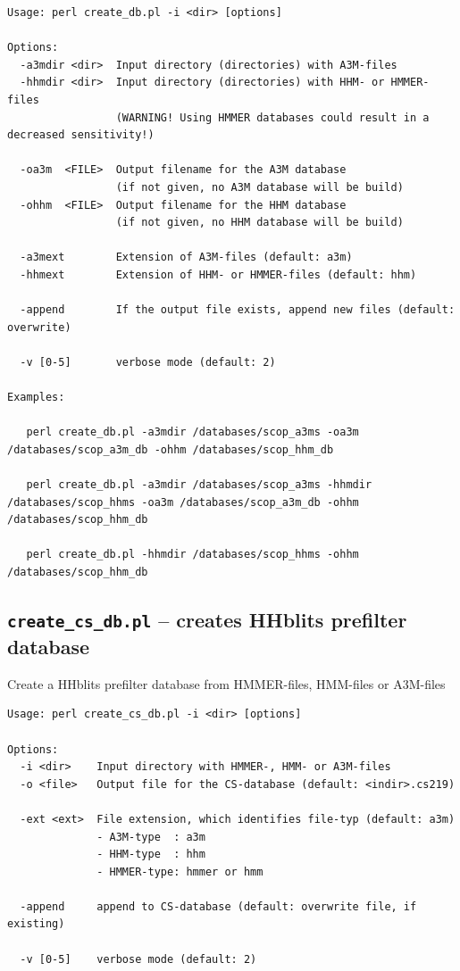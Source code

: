 \documentclass[11pt,a4paper]{article}
\begin{document}
\small \begin{verbatim}
Usage: perl create_db.pl -i <dir> [options]

Options:
  -a3mdir <dir>  Input directory (directories) with A3M-files
  -hhmdir <dir>  Input directory (directories) with HHM- or HMMER-files 
                 (WARNING! Using HMMER databases could result in a decreased sensitivity!)

  -oa3m  <FILE>  Output filename for the A3M database 
                 (if not given, no A3M database will be build)
  -ohhm  <FILE>  Output filename for the HHM database 
                 (if not given, no HHM database will be build)

  -a3mext        Extension of A3M-files (default: a3m)
  -hhmext        Extension of HHM- or HMMER-files (default: hhm)

  -append        If the output file exists, append new files (default: overwrite)

  -v [0-5]       verbose mode (default: 2)

Examples:

   perl create_db.pl -a3mdir /databases/scop_a3ms -oa3m /databases/scop_a3m_db -ohhm /databases/scop_hhm_db

   perl create_db.pl -a3mdir /databases/scop_a3ms -hhmdir /databases/scop_hhms -oa3m /databases/scop_a3m_db -ohhm /databases/scop_hhm_db

   perl create_db.pl -hhmdir /databases/scop_hhms -ohhm /databases/scop_hhm_db
\end{verbatim} \normalsize

\subsection{{\tt create\_cs\_db.pl} -- creates HHblits prefilter database}

Create a HHblits prefilter database from HMMER-files, HMM-files or A3M-files

\small \begin{verbatim}
Usage: perl create_cs_db.pl -i <dir> [options]

Options:
  -i <dir>    Input directory with HMMER-, HMM- or A3M-files
  -o <file>   Output file for the CS-database (default: <indir>.cs219)

  -ext <ext>  File extension, which identifies file-typ (default: a3m)
              - A3M-type  : a3m
              - HHM-type  : hhm
              - HMMER-type: hmmer or hmm

  -append     append to CS-database (default: overwrite file, if existing)

  -v [0-5]    verbose mode (default: 2)
\end{verbatim} \normalsize
\end{document}
